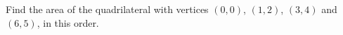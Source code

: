 Find the area of the quadrilateral with vertices $(0,0)$, $(1,2)$, $(3,4)$ and $(6,5)$, in this order.
